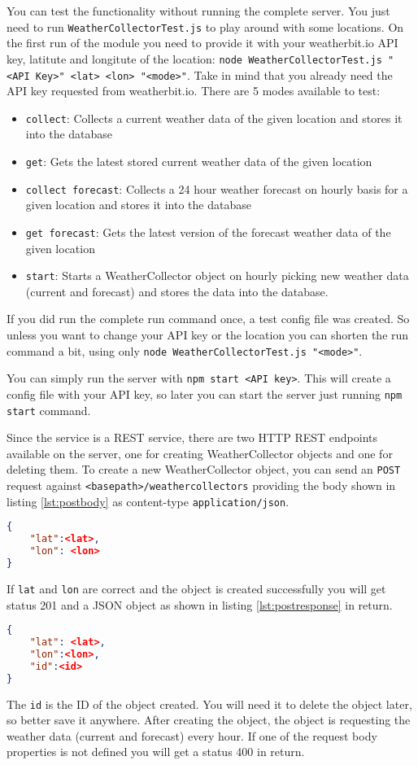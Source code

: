 You can test the functionality without running the complete server.
You just need to run \texttt{WeatherCollectorTest.js} to play around with some locations. 
On the first run of the module you need to provide it with your weatherbit.io API key, latitute and longitute of the location: \texttt{node WeatherCollectorTest.js "<API Key>" <lat> <lon> "<mode>"}. 
Take in mind that you already need the API key requested from weatherbit.io.
There are 5 modes available to test:
\begin{itemize}
	\item \texttt{collect}: Collects a current weather data of the given location and stores it into the database
	\item \texttt{get}: Gets the latest stored current weather data of the given location
	\item \texttt{collect forecast}: Collects a 24 hour weather forecast on hourly basis for a given location and stores it into the database
	\item \texttt{get forecast}: Gets the latest version of the forecast weather data of the given location
	\item \texttt{start}: Starts a WeatherCollector object on hourly picking new weather data (current and forecast) and stores the data into the database.
\end{itemize}

If you did run the complete run command once, a test config file was created. 
So unless you want to change your API key or the location you can shorten the run command a bit, using only \texttt{node WeatherCollectorTest.js "<mode>"}.

You can simply run the server with \texttt{npm start <API key>}. 
This will create a config file with your API key, so later you can start the server just running \texttt{npm start} command.

Since the service is a REST service, there are two HTTP REST endpoints available on the server, one for creating WeatherCollector objects and one for deleting them.
To create a new WeatherCollector object, you can send an \texttt{POST} request against \texttt{<basepath>/weathercollectors} providing the body shown in listing \ref{lst:postbody} as content-type \texttt{application/json}. 
\begin{lstlisting}[caption={Body of \texttt{POST} request endpoint}, label={lst:postbody}, frame=single, language=json]
{ 
	"lat":<lat>, 
	"lon": <lon> 
}
\end{lstlisting} 
If \texttt{lat} and \texttt{lon} are correct and the object is created successfully you will get status 201 and a JSON object as shown in listing \ref{lst:postresponse} in return.
\begin{lstlisting}[caption={Body of the response of the \texttt{POST} request}, label={lst:postresponse}, frame=single, language=json]
{ 
	"lat": <lat>, 
	"lon":<lon>, 
	"id":<id> 
}
\end{lstlisting}
The \texttt{id} is the ID of the object created. 
You will need it to delete the object later, so better save it anywhere. 
After creating the object, the object is requesting the weather data (current and forecast) every hour. 
If one of the request body properties is not defined you will get a status 400 in return.

